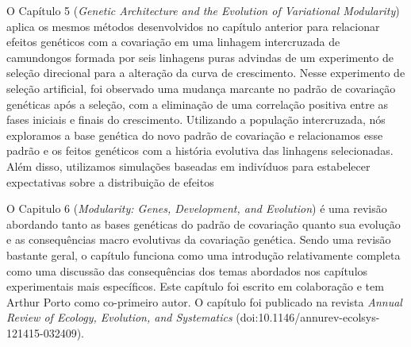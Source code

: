 \begin{refsection}
O Capítulo 5 (\textit{Genetic Architecture and the Evolution of Variational
Modularity}) aplica os mesmos métodos desenvolvidos no capítulo anterior para
relacionar efeitos genéticos com a covariação em uma linhagem intercruzada de
camundongos formada por seis linhagens puras advindas de um experimento de
seleção direcional para a alteração da curva de crescimento. Nesse experimento
de seleção artificial, foi observado uma mudança marcante no padrão de
covariação genéticas após a seleção, com a eliminação de uma correlação
positiva entre as fases iniciais e finais do crescimento. Utilizando a
população intercruzada, nós exploramos a base genética do novo padrão de
covariação e relacionamos esse padrão e os feitos genéticos com a história
evolutiva das linhagens selecionadas. Além disso, utilizamos simulações baseadas
em indivíduos para estabelecer expectativas sobre a distribuição de efeitos

O Capitulo 6 (\textit{Modularity: Genes, Development, and Evolution}) é uma
revisão abordando tanto as bases genéticas do padrão de covariação quanto sua
evolução e as consequências macro evolutivas da covariação genética. Sendo uma
revisão bastante geral, o capítulo funciona como uma introdução relativamente
completa como uma discussão das consequências dos temas abordados nos
capítulos experimentais mais específicos. Este capítulo foi escrito em
colaboração e tem Arthur Porto como co-primeiro autor. O capítulo foi
publicado na revista \textit{Annual Review of Ecology, Evolution, and
Systematics} (doi:10.1146/annurev-ecolsys-121415-032409).


\printbibliography


\end{refsection}